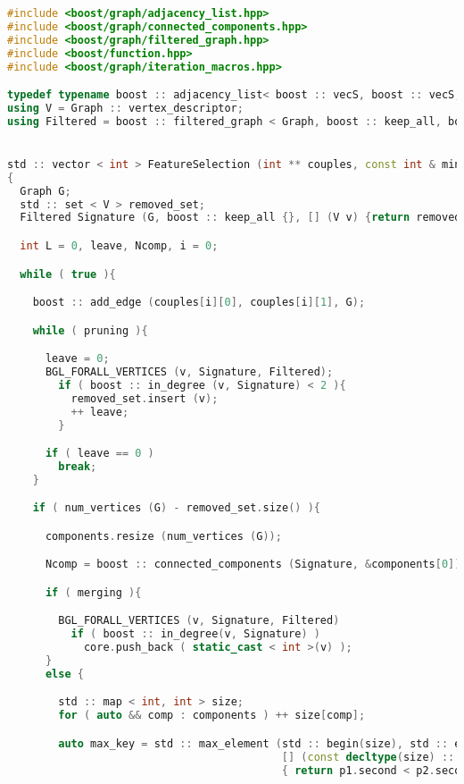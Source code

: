 \documentclass{standalone}
\begin{document}
\lstset{style=c++}
\begin{lstlisting}[language=C++, caption=DNetPRO signature extraction, label=code:featuresel]
#include <boost/graph/adjacency_list.hpp>
#include <boost/graph/connected_components.hpp>
#include <boost/graph/filtered_graph.hpp>
#include <boost/function.hpp>
#include <boost/graph/iteration_macros.hpp>

typedef typename boost :: adjacency_list< boost :: vecS, boost :: vecS, boost :: undirectedS, boost :: property< boost :: vertex_color_t, int >, boost :: property < boost :: edge_index_t, int > > Graph;
using V = Graph :: vertex_descriptor;
using Filtered = boost :: filtered_graph < Graph, boost :: keep_all, boost :: function < bool(V) > >;


std :: vector < int > FeatureSelection (int ** couples, const int & min_size, bool pruning=true,  bool merging=true)
{
  Graph G;
  std :: set < V > removed_set;
  Filtered Signature (G, boost :: keep_all {}, [] (V v) {return removed_set.end() == removed_set.find(v);});

  int L = 0, leave, Ncomp, i = 0;

  while ( true ){

    boost :: add_edge (couples[i][0], couples[i][1], G);

    while ( pruning ){

      leave = 0;
      BGL_FORALL_VERTICES (v, Signature, Filtered);
        if ( boost :: in_degree (v, Signature) < 2 ){
          removed_set.insert (v);
          ++ leave;
        }

      if ( leave == 0 )
        break;
    }

    if ( num_vertices (G) - removed_set.size() ){

      components.resize (num_vertices (G));

      Ncomp = boost :: connected_components (Signature, &components[0]);

      if ( merging ){

        BGL_FORALL_VERTICES (v, Signature, Filtered)
          if ( boost :: in_degree(v, Signature) )
            core.push_back ( static_cast < int >(v) );
      }
      else {

        std :: map < int, int > size;
        for ( auto && comp : components ) ++ size[comp];

        auto max_key = std :: max_element (std :: begin(size), std :: end(size),
                                           [] (const decltype(size) :: value_type && p1, const decltype(size) :: value_type && p2)
                                           { return p1.second < p2.second; })->first;


\end{lstlisting}
\end{document}
